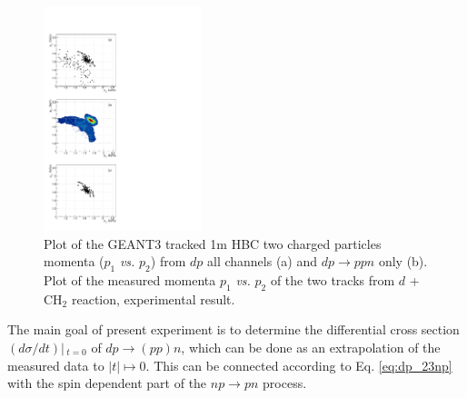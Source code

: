\documentclass[twocolumn,epjc3]{svjour3}
\newcommand{\np}     {\ensuremath{np \rightarrow pn}\xspace}
\newcommand{\dpfrag} {\ensuremath{dp \rightarrow ppn}\xspace}
\newcommand{\dpchex} {\ensuremath{dp \rightarrow (pp)n}\xspace}
\begin{document}
\begin{figure}[t]
  \centering
  \includegraphics[width=0.41\textwidth]{p1_vs_p2_1.pdf} %
  \caption{Plot of the GEANT3 tracked 1m HBC two charged particles momenta
    ($p_1$ \textit{vs.} $p_2$) from $dp$ all channels (a) and \dpfrag only (b). \\
    Plot of the measured momenta $p_1$ \textit{vs.} $p_2$ of the two
    tracks from $d$ + CH$_{2}$ reaction, experimental result.}
  \label{fig:p1vsp2}
\end{figure}




The main goal of present experiment is to determine the differential cross
section $(d\sigma/dt)|\,_{t=0}$ of \dpchex, which can be done as an
extrapolation of the measured data to $|t|\mapsto0$. This can be connected according
to Eq. \eqref{eq:dp_23np} with the spin dependent part of the \np process.

\end{document}
